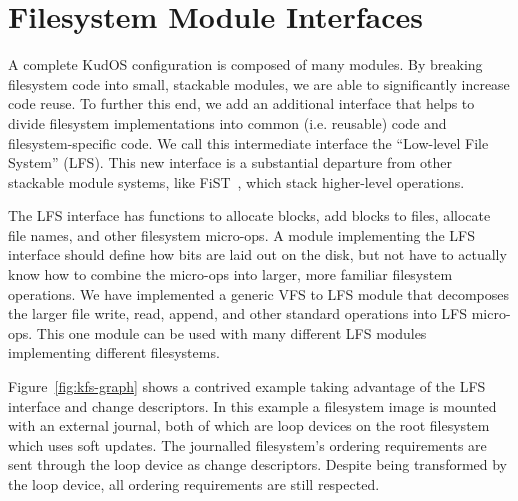 \preparagraphspacing{}
\section*{Filesystem Module Interfaces}
\label{sec:interfaces}

A complete KudOS configuration is composed of many modules.
By breaking filesystem code into
small, stackable modules, we are able to significantly increase code reuse. To
further this end, we add an additional interface that helps to divide filesystem
implementations into common (i.e. reusable) code and filesystem-specific code.
We call this intermediate interface the ``Low-level File System'' (LFS). This
new interface is a substantial departure from other stackable module systems,
like FiST~\cite{zadok00fist}, which stack higher-level operations.

The LFS interface has functions to allocate blocks, add blocks to
files, allocate file names, and other filesystem micro-ops. A module
implementing the LFS interface should define how bits are laid out on
the disk, but not have to actually know how to combine the micro-ops
into larger, more familiar filesystem operations. We have implemented
a generic VFS to LFS module that decomposes the larger file write,
read, append, and other standard operations into LFS micro-ops. This
one module can be used with many different LFS modules implementing
different filesystems.

Figure~\ref{fig:kfs-graph} shows a contrived example taking advantage of the LFS
interface and change descriptors. In this example a filesystem image is mounted
with an external journal, both of which are loop devices on the root filesystem
which uses soft updates. The journalled filesystem's ordering requirements are
sent through the loop device as change descriptors. Despite being transformed
by the loop device, all ordering requirements are still respected.
